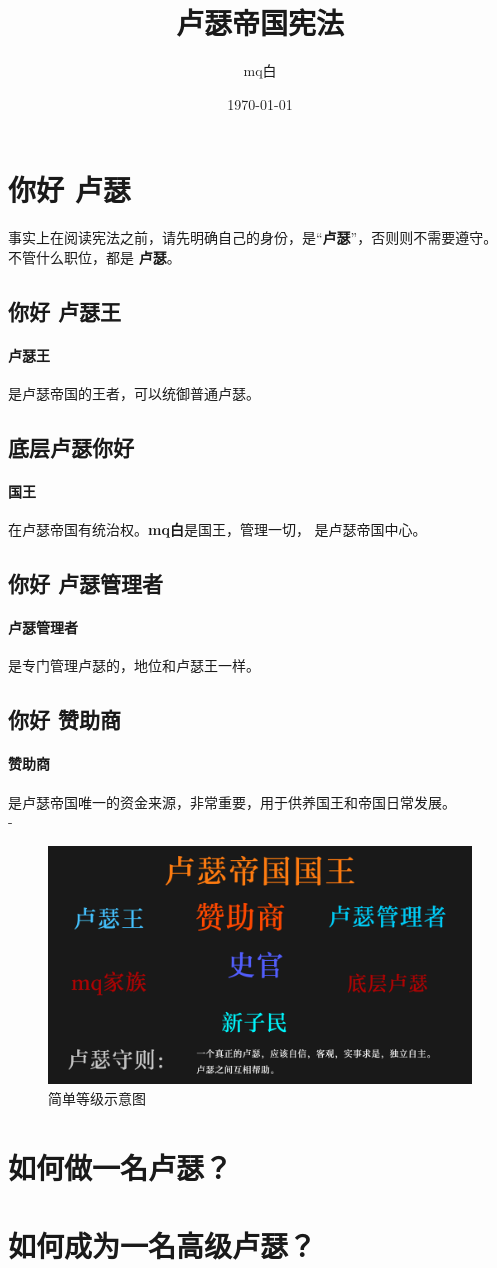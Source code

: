 \documentclass[UTF8,11pt,a4paper]{ctexart}
\title{卢瑟帝国宪法 }
\author{mq白}
\date{\today}
\begin{document}
\maketitle
\section{你好 卢瑟}
事实上在阅读宪法之前，请先明确自己的身份，是“\textbf{卢瑟}”，否则则不需要遵守。
不管什么职位，都是 \textbf{卢瑟}。
\subsection{你好 卢瑟王}
\paragraph{卢瑟王}是卢瑟帝国的王者，可以统御普通卢瑟。
\subsection{底层卢瑟你好}
\paragraph{国王}在卢瑟帝国有统治权。\textbf{mq白}是国王，管理一切， 是卢瑟帝国中心。
\subsection{你好 卢瑟管理者}
\paragraph{卢瑟管理者}是专门管理卢瑟的，地位和卢瑟王一样。

\subsection{你好 赞助商}
\paragraph{赞助商}是卢瑟帝国唯一的资金来源，非常重要，用于供养国王和帝国日常发展。\\
{\color{white}-}
\begin{figure}[H]
    \caption{简单等级示意图} 
    \centering 
    \includegraphics[width = .7\textwidth]{resource/luse.png}
\end{figure}

 

\section{如何做一名卢瑟？}



\section{如何成为一名高级卢瑟？}


\end{document}
